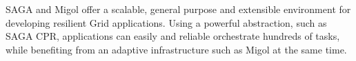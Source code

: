 \documentclass{rspublic}
\newcommand{\jhanote}[1]{ {\textcolor{red} { ***SJ: #1 }}}
\newcommand{\jhanote}[1]{}
\begin{document}
SAGA and Migol offer a scalable, general purpose and extensible environment for developing resilient Grid applications. 
Using a powerful abstraction, such as SAGA CPR, applications can easily and reliable 
orchestrate hundreds of tasks, while benefiting from an adaptive infrastructure such as Migol at the same time.







\end{document}
